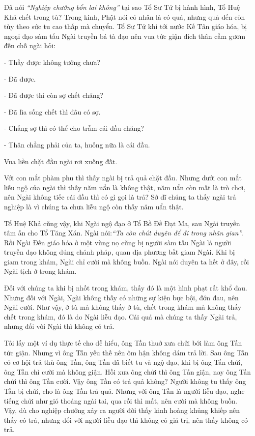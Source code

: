 \documentclass[
  12pt,
  oneside]{book}
\begin{document}
Đã nói \emph{``Nghiệp chướng bổn lai không''} tại sao Tổ Sư Tử bị hành hình, Tổ Huệ Khả chết trong tù? Trong kinh, Phật nói có nhân là có quả, nhưng quả đến còn tùy theo sức tu cao thấp mà chuyển. Tổ Sư Tử khi tới nước Kế Tân giáo hóa, bị ngoại đạo sàm tấu Ngài truyền bá tà đạo nên vua tức giận đích thân cầm gươm đến chỗ ngài hỏi:

- Thầy được không tướng chưa?

- Đã được.

- Đã được thì còn sợ chết chăng?

- Đã lìa sống chết thì đâu có sợ.

- Chẳng sợ thì có thể cho trẫm cái đầu chăng?

- Thân chẳng phải của ta, huống nữa là cái đầu.

Vua liền chặt đầu ngài rơi xuống đất.

Với con mắt phàm phu thì thấy ngài bị trả quả chặt đầu. Nhưng dưới con mắt liễu ngộ của ngài thì thấy năm uẩn là không thật, năm uẩn còn mất là trò chơi, nên Ngài không tiếc cái đầu thì có gì gọi là trả? Sở dĩ chúng ta thấy ngài trả nghiệp là vì chúng ta chưa liễu ngộ còn thấy năm uẩn thật.

Tổ Huệ Khả cũng vậy, khi Ngài ngộ đạo ở Tổ Bồ Đề Đạt Ma, sau Ngài truyền tâm ấn cho Tổ Tăng Xán. Ngài nói:\emph{``Ta còn chút duyên để đi trong nhân gian''}. Rồi Ngài Đến giáo hóa ở một vùng nọ cũng bị người sàm tấu Ngài là người truyền đạo không đúng chánh pháp, quan địa phương bắt giam Ngài. Khi bị giam trong khám, Ngài chỉ cười mà không buồn. Ngài nói duyên ta hết ở đây, rồi Ngài tịch ở trong khám.

Đối với chúng ta khi bị nhốt trong khám, thấy đó là một hình phạt rất khổ đau. Nhưng đối với Ngài, Ngài không thấy có những sự kiện bực bội, đớn đau, nên Ngài cười. Như vậy, ở tù mà không thấy ở tù, chết trong khám mà không thấy chết trong khám, đó là do Ngài liễu đạo. Cái quả mà chúng ta thấy Ngài trả, nhưng đối với Ngài thì không có trả.

Tôi lấy một ví dụ thực tế cho dễ hiểu, ông Tần thuở xưa chửi bới làm ông Tấn tức giận. Nhưng vì ông Tấn yếu thế nên ôm hận không dám trả lời. Sau ông Tấn có cơ hội trả thù ông Tần, ông Tần đã biết tu và ngộ đạo, khi bị ông Tấn chửi, ông Tần chì cười mà không giận. Hồi xưa ông chửi thì ông Tấn giận, nay ông Tấn chửi thì ông Tần cười. Vậy ông Tần có trả quả không? Người không tu thấy ông Tần bị chửi, cho là ông Tần trả quả. Nhưng với ông Tần là người liễu đạo, nghe tiếng chửi như gió thoảng ngài tai, qua rồi thì mất, nên cười mà không buồn. Vậy, dù cho nghiệp chướng xảy ra người đời thấy kinh hoàng khủng khiếp nên thấy có trả, nhưng đối với người liễu đạo thì không có giá trị, nên thấy không có trả.
\end{document}
